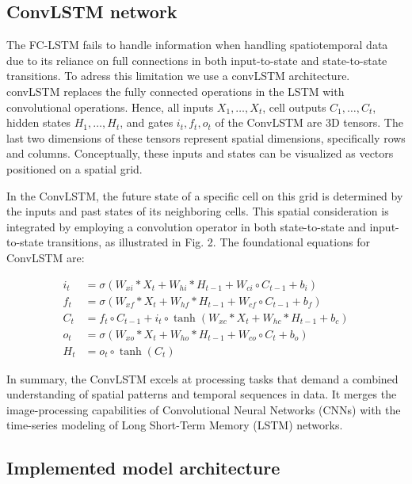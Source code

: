 \documentclass[
]{agujournal2019}
\begin{document}
\hypertarget{convlstm-network}{%
\subsection{ConvLSTM network}\label{convlstm-network}}

The FC-LSTM fails to handle information when handling spatiotemporal
data due to its reliance on full connections in both input-to-state and
state-to-state transitions. To adress this limitation we use a convLSTM
architecture. convLSTM replaces the fully connected operations in the
LSTM with convolutional operations. Hence, all inputs
\(X_1, \ldots, X_t\), cell outputs \(C_1, \ldots, C_t\), hidden states
\(H_1, \ldots, H_t\), and gates \(i_t, f_t, o_t\) of the ConvLSTM are 3D
tensors. The last two dimensions of these tensors represent spatial
dimensions, specifically rows and columns. Conceptually, these inputs
and states can be visualized as vectors positioned on a spatial grid.

In the ConvLSTM, the future state of a specific cell on this grid is
determined by the inputs and past states of its neighboring cells. This
spatial consideration is integrated by employing a convolution operator
in both state-to-state and input-to-state transitions, as illustrated in
Fig. 2. The foundational equations for ConvLSTM are:

\[
\begin{aligned}
i_t &= \sigma(W_{xi} \ast X_t + W_{hi} \ast H_{t-1} + W_{ci} \circ C_{t-1} + b_i) \\
f_t &= \sigma(W_{xf} \ast X_t + W_{hf} \ast H_{t-1} + W_{cf} \circ C_{t-1} + b_f) \\
C_t &= f_t \circ C_{t-1} + i_t \circ \tanh(W_{xc} \ast X_t + W_{hc} \ast H_{t-1} + b_c) \\
o_t &= \sigma(W_{xo} \ast X_t + W_{ho} \ast H_{t-1} + W_{co} \circ C_t + b_o) \\
H_t &= o_t \circ \tanh(C_t)
\end{aligned}
\]

In summary, the ConvLSTM excels at processing tasks that demand a
combined understanding of spatial patterns and temporal sequences in
data. It merges the image-processing capabilities of Convolutional
Neural Networks (CNNs) with the time-series modeling of Long Short-Term
Memory (LSTM) networks.

\hypertarget{implemented-model-architecture}{%
\subsection{Implemented model
architecture}\label{implemented-model-architecture}}
\end{document}
